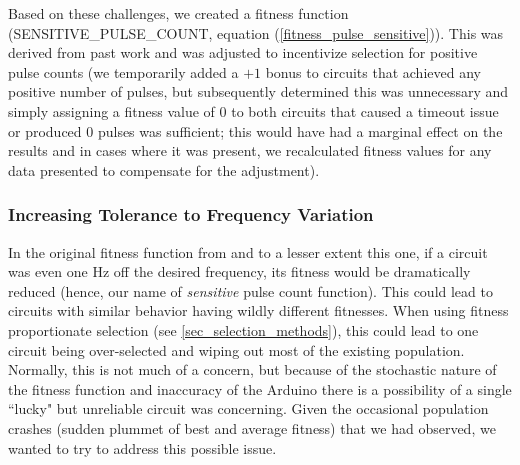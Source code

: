 \documentclass{ieeeaccess}
\newcommand{\highlight}[1]{#1}
\begin{document}
Based on these challenges, we created a fitness function (SENSITIVE\_PULSE\_COUNT, equation (\ref{fitness_pulse_sensitive})). This was derived from past work \cite{Whitley2021ResurrectingHardware} and was adjusted to incentivize selection for positive pulse counts \highlight{(we temporarily added a $+1$ bonus to circuits that achieved any positive number of pulses, but subsequently determined this was unnecessary and simply assigning a fitness value of 0 to both circuits that caused a timeout issue or produced 0 pulses was sufficient; this would have had a marginal effect on the results and in cases where it was present, we recalculated fitness values for any data presented to compensate for the adjustment).}







\subsubsection{Increasing Tolerance to Frequency Variation}

In the original fitness function from \cite{Whitley2021ResurrectingHardware} and to a lesser extent this one, if a circuit was even one Hz off the desired frequency, its fitness would be dramatically reduced (hence, our name of \textit{sensitive} pulse count function). This could lead to circuits with similar behavior having wildly different fitnesses. When using fitness proportionate selection (see \ref{sec_selection_methods}), this could lead to one circuit being over-selected and wiping out most of the existing population. Normally, this is not much of a concern, but because of the stochastic nature of the fitness function and inaccuracy of the Arduino there is a possibility of a single ``lucky" but unreliable circuit was concerning. Given the occasional population crashes (sudden plummet of best and average fitness) that we had observed, we wanted to try to address this possible issue.
\end{document}
